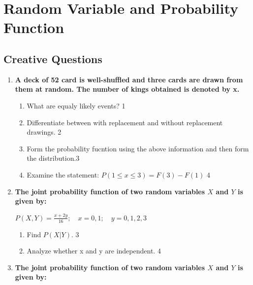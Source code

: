 \documentclass[a4paper,oneside, margin=1.4in]{book}
\begin{document}
\chapter{Random Variable and Probability Function}\label{sec:rv2}

\section{Creative Questions}

  \begin{enumerate}
  
 \item
	  \textbf{A deck of 52 card is well-shuffled and three cards are drawn from them at random. The number of kings obtained is denoted by x.} 
  
  \begin{enumerate}
    \item
	What are equaly likely events? \hfill 1
    \item
	Differentiate between with replacement and without replacement drawings. \hfill 2
    \item  
	Form the probability fucntion using the above information and then form the distribution.\hfill 3
    \item
	Examine the statement: $P(1 \le x \le 3) = F(3)-F(1)$ \hfill 4
  \end{enumerate}
  
  \item
  \textbf{The joint probability function of two random variables \( X \) and \( Y \) is given by:}
  
  \begin{center}
  \( \displaystyle P(X,Y) = \frac{x + 2y}{16}; \quad x = 0, 1; \quad y = 0, 1, 2, 3 \)
  \end{center}
 
  \begin{enumerate}
    \item
    	Find \( P(X | Y) \). \hfill 3
    \item
     	Analyze whether x and y are independent. \hfill 4
  \end{enumerate}  

  \item
  \textbf{The joint probability function of two random variables \( X \) and \( Y \) is given by:}
  

\end{enumerate}
\end{document}
